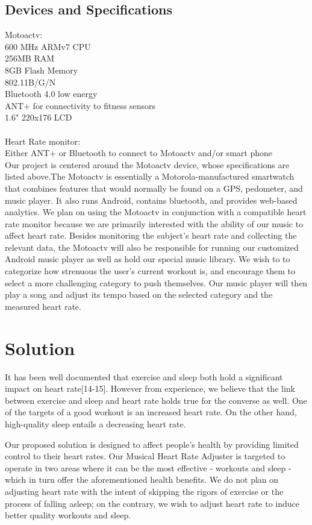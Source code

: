 \documentclass[letterpaper,english, 12pt]{scrreprt}
\begin{document}
\subsection{Devices and Specifications}
Motoactv:\\
600 MHz ARMv7 CPU\\
256MB RAM\\
8GB Flash Memory\\
802.11B/G/N\\
Bluetooth 4.0 low energy\\
ANT+ for connectivity to fitness sensors\\
1.6" 220x176 LCD\\
\\
Heart Rate monitor:\\
Either ANT+ or Bluetooth to connect to Motoactv and/or smart phone\\

Our project is centered around the Motoactv device, whose specifications are listed above.The Motoactv is essentially a Motorola-manufactured smartwatch that combines features that would normally be found on a GPS, pedometer, and music player. It also runs Android, contains bluetooth, and provides web-based analytics. We plan on using the Motoactv in conjunction with a compatible heart rate monitor because we are primarily interested with the ability of our music to affect heart rate. Besides monitoring the subject's heart rate and collecting the relevant data, the Motoactv will also be responsible for running our customized Android music player as well as hold our special music library. We wish to to categorize how strenuous the user's current workout is, and encourage them to select a more challenging category to push themselves. Our music player will then play a song and adjust its tempo based on the selected category and the measured heart rate.

\section{Solution}
It has been well documented that exercise and sleep both hold a significant impact on heart rate[14-15]. However from experience, we believe that the link between exercise and sleep and heart rate holds true for the converse as well. One of the targets of a good workout is an increased heart rate. On the other hand, high-quality sleep entails a decreasing heart rate.
			 
Our proposed solution is designed to affect people's health by providing limited control to their heart rates. Our Musical Heart Rate Adjuster is targeted to operate in two areas where it can be the most effective - workouts and sleep - which in turn offer the aforementioned health benefits. We do not plan on adjusting heart rate with the intent of skipping the rigors of exercise or the process of falling asleep; on the contrary, we wish to adjust heart rate to induce better quality workouts and sleep.
			 
\end{document}
